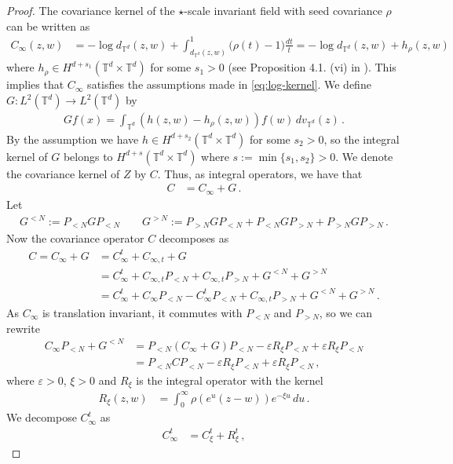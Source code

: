 \documentclass[11pt]{article}
\numberwithin{equation}{section}
\theoremstyle{definition}
\def\eps{\varepsilon}
\def\T{\mathbb{T}}
\newcommand{\PN}{ {P_{< N}} }
\newcommand{\PNN}{ {P_{>N}} }
\begin{document}
\begin{proof}
The covariance kernel of the $\star$-scale invariant field with seed covariance $\rho$ can be written as
\begin{align*}
C_\infty(z,w) &= -\log d_{\T^d}(z,w) + \int_{d_{\T^d}(z,w)}^1 \big(\rho(t)-1\big) \tfrac{dt}{t} = - \log d_{\T^d}(z,w) + h_\rho(z,w)
\end{align*}
where $h_\rho \in H^{d + s_1}(\T^d \times \T^d)$ for some $s_1 >0$ (see Proposition 4.1. (vi) in \cite{JSW}). This implies that $C_\infty$ satisfies the assumptions made in \eqref{eq:log-kernel}. We define $G:L^2(\T^d) \to L^2(\T^d)$ by
\begin{align*}
Gf(x) = \int_{\T^d} (h(z,w)-h_\rho(z,w)) f(w) \, dv_{\T^d}(z)\,.
\end{align*}
By the assumption we have $h \in H^{d+s_2}(\T^d \times \T^d)$ for some $s_2 > 0$, so the integral kernel of $G$ belongs to $H^{d+s}(\T^d \times \T^d)$ where $s := \min\{s_1,s_2\} > 0$. We denote the covariance kernel of $Z$ by $C$. Thus, as integral operators, we have that
\begin{align*}
C &= C_\infty + G\,.
\end{align*}
Let
\begin{align*}
   G^{<N}:=\PN G \PN \qquad  G^{>N}:= \PNN G \PN + \PN G \PNN + \PNN G \PNN\,.
\end{align*}
Now the covariance operator $C$ decomposes as
   \begin{align}
   C =  C_\infty+G &= C_\infty^t +  C_{\infty,t}+G \nonumber \\
   & =C_\infty^t + C_{\infty,t} \PN + C_{\infty,t} \PNN+G^{<N}+G^{>N} \nonumber \\
   &= C_\infty^t + C_\infty \PN - C_\infty^t \PN + C_{\infty,t} \PNN +G^{<N} + G^{>N} \,.
\end{align}
As $C_\infty$ is translation invariant, it commutes with $\PN$ and $\PNN$, so we can rewrite
\begin{align*}
C_\infty \PN + G^{<N} &= \PN (C_\infty+G) \PN   - \eps R_\xi \PN + \eps R_\xi \PN \\
&= \PN C \PN - \eps R_\xi \PN + \eps R_\xi \PN\,,
\end{align*}
where $\eps > 0$, $\xi > 0$ and $R_\xi$ is the integral operator with the kernel
\begin{align*}
R_\xi(z,w) &= \int_0^\infty \rho(e^u(z-w)) e^{-\xi u} \, du\,.
\end{align*}
We decompose $C^t_\infty$ as 
\begin{align*}
C_\infty^t &= C_\xi^t  + R^t_\xi \,,

\end{align*}
\end{proof}
\end{document}
